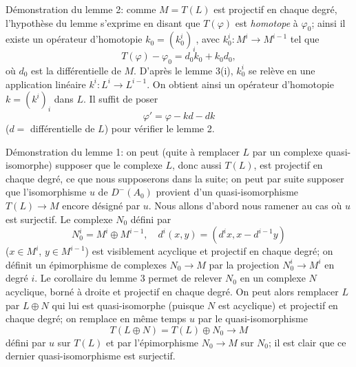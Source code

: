 Démonstration du lemme 2: comme $M=T(L)$ est projectif en chaque degré, l'hypothèse du lemme s'exprime en disant que $T(\varphi)$ est \emph{homotope} à $\varphi_0$; ainsi il existe un opérateur d'homotopie $k_0=(k_0^i)_i$, avec $k_0^i:M^i\to M^{i-1}$ tel que
\[
T(\varphi)-\varphi_0=d_0k_0+k_0d_0,
\]
où $d_0$ est la différentielle de $M$. D'après le lemme 3(i), $k_0^i$ se relève en une application linéaire $k^i:L^i\to L^{i-1}$. On obtient ainsi un opérateur d'homotopie $k=(k^i)_i$ dans $L$. Il suffit de poser
\[
\varphi'=\varphi-kd-dk
\]
($d=$ différentielle de $L$) pour vérifier le lemme 2.

Démonstration du lemme 1: on peut (quite à remplacer $L$ par un complexe quasi-isomorphe) supposer que le complexe $L$, donc aussi $T(L)$, 
est
projectif en chaque degré, ce que nous supposerons dans la suite; on peut par suite supposer que l'isomorphisme $u$ de $D^-(A_0)$ provient d'un quasi-isomorphisme $T(L)\to M$ encore désigné par $u$. Nous allons d'abord nous ramener au cas où $u$ est surjectif. Le complexe $N_0$ défini par
\[
N_0^i=M^i\oplus M^{i-1},
\quad
 d^i(x,y)=(d^i x,x-d^{i-1}y)
\]
($x\in M^i$, $y\in M^{i-1}$) est visiblement acyclique et projectif en chaque degré; on définit un épimorphisme de complexes $N_0\to M$ par la projection $N_0^i\to M^i$ en degré $i$. Le corollaire du lemme 3 permet de relever $N_0$ en un complexe $N$ acyclique, borné à droite et projectif en chaque degré. On peut alors remplacer $L$ par $L\oplus N$ qui lui est quasi-isomorphe (puisque $N$ est acyclique) et projectif en chaque degré; on remplace en même temps $u$ par le quasi-isomorphisme
\[
T(L\oplus N)=T(L)\oplus N_0\longrightarrow M
\]
défini par $u$ sur $T(L)$ et par l'épimorphisme $N_0\to M$ sur $N_0$; il est clair que ce dernier quasi-isomorphisme est surjectif.

